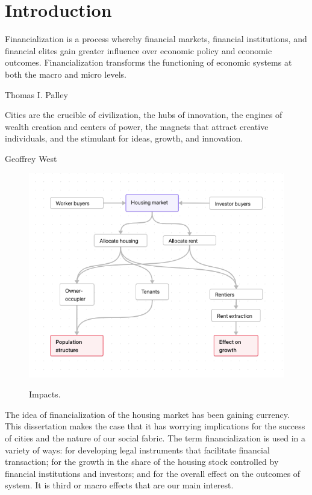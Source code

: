 \chapter{Introduction} \label{chapter-introduction}

\epigraph{Financialization is a process whereby financial markets, financial institutions, and financial elites gain greater influence over economic policy and economic outcomes. Financialization transforms the functioning of economic systems at both the macro and micro levels.}{Thomas I. Palley \cite{palleyFinancializationWhatIt2007}} 


\epigraph{Cities are the crucible of civilization, the hubs of innovation, the engines of wealth creation and centers of power, the magnets that attract creative individuals, and the stimulant for ideas, growth, and innovation.}{Geoffrey West}

\begin{figure}[h!]
    \centering
    \includegraphics[scale=.60]{fig/flow_impacts.png}
    \label{Figure-impacts}
\caption{Impacts.}
\end{figure}



 The idea of financialization of the housing market has been gaining currency. This dissertation makes the case that it has worrying implications for the success of cities and the nature of our social fabric. The term financialization is used in a variety of ways:  for developing legal instruments that facilitate financial transaction;  for the growth in the share of the housing stock controlled by financial institutions and investors; and for the overall effect on the outcomes of system. It is third or  macro effects that are our main interest. 

